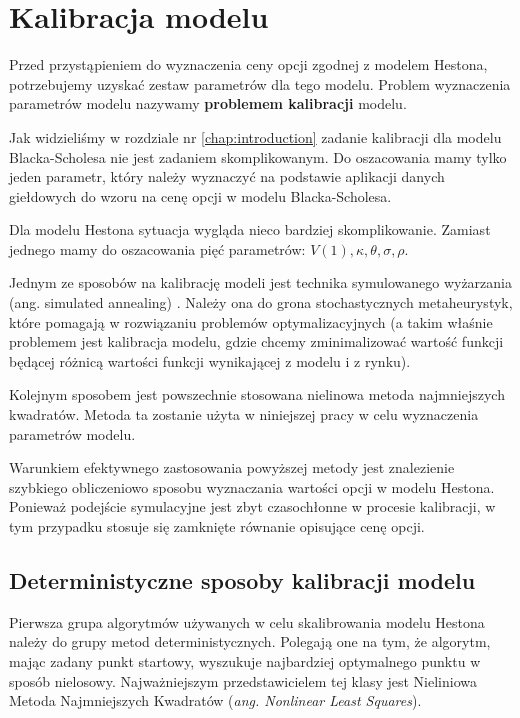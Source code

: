 \documentclass{pracamgr}
\begin{document}
\chapter{Kalibracja modelu}
\label{chap:chapterModelCalibration}



Przed przystąpieniem do wyznaczenia ceny opcji zgodnej z modelem Hestona, potrzebujemy uzyskać zestaw parametrów dla 
tego modelu. Problem wyznaczenia parametrów modelu nazywamy \textbf{problemem kalibracji} modelu.  

Jak widzieliśmy w rozdziale nr \ref{chap:introduction} zadanie kalibracji dla modelu Blacka-Scholesa nie jest 
zadaniem skomplikowanym. Do oszacowania mamy tylko jeden parametr, który należy wyznaczyć na podstawie aplikacji 
danych giełdowych do wzoru na cenę opcji w modelu Blacka-Scholesa.

Dla modelu Hestona sytuacja wygląda nieco bardziej skomplikowanie. Zamiast jednego mamy do oszacowania pięć parametrów:
$V(1),\kappa, \theta, \sigma, \rho$.  



Jednym ze sposobów na kalibrację modeli jest technika symulowanego wyżarzania (ang. simulated annealing)
. Należy ona do 
grona stochastycznych metaheurystyk,  które pomagają w rozwiązaniu problemów optymalizacyjnych (a takim właśnie problemem 
jest kalibracja modelu, gdzie chcemy zminimalizować wartość funkcji będącej różnicą wartości funkcji wynikającej z 
modelu i z rynku).

Kolejnym sposobem jest powszechnie stosowana nielinowa metoda najmniejszych kwadratów. Metoda ta zostanie użyta w niniejszej pracy w celu wyznaczenia parametrów modelu.

Warunkiem efektywnego zastosowania powyższej metody jest znalezienie szybkiego obliczeniowo sposobu wyznaczania wartości opcji w 
modelu Hestona. Ponieważ podejście symulacyjne jest zbyt czasochłonne w procesie kalibracji, w tym przypadku stosuje 
się zamknięte równanie opisujące cenę opcji.


\section{Deterministyczne sposoby kalibracji modelu} 
Pierwsza grupa algorytmów używanych w celu skalibrowania modelu Hestona należy do grupy metod deterministycznych.
Polegają one na tym, że algorytm, mając zadany punkt startowy, wyszukuje najbardziej optymalnego punktu w sposób nielosowy.
Najważniejszym przedstawicielem tej klasy jest Nieliniowa Metoda Najmniejszych Kwadratów (\textit{ang. Nonlinear Least Squares}).
\end{document}
